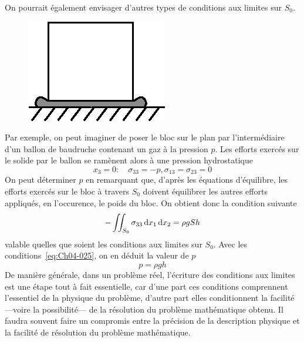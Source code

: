 On pourrait également envisager d'autres types de conditions aux limites sur $S_0$.
\begin{figure}
    \begin{center}
        \includegraphics{../images/T1_Ch04-0006}
    \end{center}
\end{figure}
Par exemple, on peut imaginer de poser le bloc sur le plan par l'intermédiaire d'un ballon de baudruche contenant un gaz à la pression $p$.
Les efforts exercés sur le solide par le ballon se ramènent alors à une pression hydrostatique
\begin{equation}
    x_3 = 0: \quad \sigma_{33} =-p, \sigma_{13} = \sigma_{23} = 0
    \label{eq:Ch04-025}
\end{equation}
On peut déterminer $p$ en remarquant que, d'après les équations d'équilibre, les efforts exercés sur le bloc à travers $S_0$ doivent équilibrer les autres efforts appliqués, en l'occurence, le poids du bloc.
On obtient donc la condition suivante
\begin{equation}
    -\iint_{S_0} \sigma_{33} \mathop{\mathrm{{}d}}\mathopen{} x_1 \mathop{\mathrm{{}d}}\mathopen{} x_2 = \rho g S h
    \label{eq:Ch04-026}
\end{equation}
valable quelles que soient les conditions aux limites sur $S_0$.
Avec les conditions~\eqref{eq:Ch04-025}, on en déduit la valeur de $p$
\begin{equation}
    p = \rho g h
    \label{eq:Ch04-027}
\end{equation}
De manière générale, dans un problème réel, l'écriture des conditions aux limites est une étape tout à fait essentielle, car d'une part ces conditions comprennent l'essentiel de la physique du problème, d'autre part elles conditionnent la facilité ---voire la possibilité--- de la résolution du problème mathématique obtenu.
Il faudra souvent faire un compromis entre la précision de la description physique et la facilité de résolution du problème mathématique.

